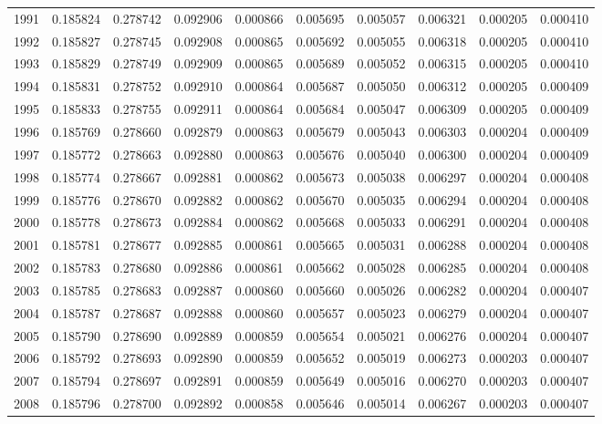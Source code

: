 \begin{tabular}{lrrrrrrrrr}
1991 & 0.185824 & 0.278742 & 0.092906 & 0.000866 & 0.005695 & 0.005057 & 0.006321 & 0.000205 & 0.000410 \\
1992 & 0.185827 & 0.278745 & 0.092908 & 0.000865 & 0.005692 & 0.005055 & 0.006318 & 0.000205 & 0.000410 \\
1993 & 0.185829 & 0.278749 & 0.092909 & 0.000865 & 0.005689 & 0.005052 & 0.006315 & 0.000205 & 0.000410 \\
1994 & 0.185831 & 0.278752 & 0.092910 & 0.000864 & 0.005687 & 0.005050 & 0.006312 & 0.000205 & 0.000409 \\
1995 & 0.185833 & 0.278755 & 0.092911 & 0.000864 & 0.005684 & 0.005047 & 0.006309 & 0.000205 & 0.000409 \\
1996 & 0.185769 & 0.278660 & 0.092879 & 0.000863 & 0.005679 & 0.005043 & 0.006303 & 0.000204 & 0.000409 \\
1997 & 0.185772 & 0.278663 & 0.092880 & 0.000863 & 0.005676 & 0.005040 & 0.006300 & 0.000204 & 0.000409 \\
1998 & 0.185774 & 0.278667 & 0.092881 & 0.000862 & 0.005673 & 0.005038 & 0.006297 & 0.000204 & 0.000408 \\
1999 & 0.185776 & 0.278670 & 0.092882 & 0.000862 & 0.005670 & 0.005035 & 0.006294 & 0.000204 & 0.000408 \\
2000 & 0.185778 & 0.278673 & 0.092884 & 0.000862 & 0.005668 & 0.005033 & 0.006291 & 0.000204 & 0.000408 \\
2001 & 0.185781 & 0.278677 & 0.092885 & 0.000861 & 0.005665 & 0.005031 & 0.006288 & 0.000204 & 0.000408 \\
2002 & 0.185783 & 0.278680 & 0.092886 & 0.000861 & 0.005662 & 0.005028 & 0.006285 & 0.000204 & 0.000408 \\
2003 & 0.185785 & 0.278683 & 0.092887 & 0.000860 & 0.005660 & 0.005026 & 0.006282 & 0.000204 & 0.000407 \\
2004 & 0.185787 & 0.278687 & 0.092888 & 0.000860 & 0.005657 & 0.005023 & 0.006279 & 0.000204 & 0.000407 \\
2005 & 0.185790 & 0.278690 & 0.092889 & 0.000859 & 0.005654 & 0.005021 & 0.006276 & 0.000204 & 0.000407 \\
2006 & 0.185792 & 0.278693 & 0.092890 & 0.000859 & 0.005652 & 0.005019 & 0.006273 & 0.000203 & 0.000407 \\
2007 & 0.185794 & 0.278697 & 0.092891 & 0.000859 & 0.005649 & 0.005016 & 0.006270 & 0.000203 & 0.000407 \\
2008 & 0.185796 & 0.278700 & 0.092892 & 0.000858 & 0.005646 & 0.005014 & 0.006267 & 0.000203 & 0.000407 \\

\end{tabular}
